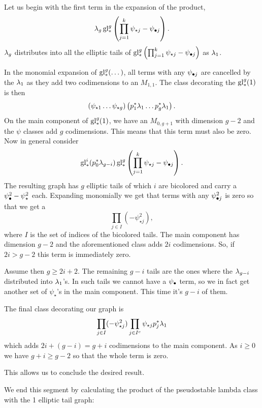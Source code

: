\documentclass[12pt]{memoir}
\begin{document}
\begin{ptcb}
    Let us begin with the first term in the expansion of the product,
    \[
        \lambda_g\operatorname{gl}_{\ast}^g\left(\prod_{j=1}^{k}\psi_{\star j}-\psi_{\bullet j}\right).
    \]
    \(\lambda_g\) distributes into all the elliptic tails of \(\operatorname{gl}_{\ast}^g\left(\prod_{j=1}^{k}\psi_{\star j}-\psi_{\bullet j}\right)\) as \(\lambda_1\).\par
    In the monomial expansion of \(\operatorname{gl}_{\ast}^g(\dots)\), all terms with any \(\psi_{\bullet j}\) are cancelled by the \(\lambda_1\) as they add two codimensions to an \(M_{1,1}\). The class decorating the \(\operatorname{gl}_\ast^g(1)\) is then
    \[
        \left(\psi_{\star1}\dots\psi_{\star g}\right)\left(p_1^\ast\lambda_1\dots p_g^\ast\lambda_1\right).
    \]
    On the main component of \(\operatorname{gl}_\ast^g(1)\), we have an \(M_{0,g+1}\) with dimension \(g-2\) and the \(\psi\) classes add \(g\) codimensions. This means that this term must also be zero.
    \tcbline
    Now in general consider
    \[
        \operatorname{gl}_\ast^i(p_0^\ast\lambda_{g-i})\operatorname{gl}_{\ast}^g\left(\prod_{j=1}^{k}\psi_{\star j}-\psi_{\bullet j}\right).
    \]
    The resulting graph has \(g\) elliptic tails of which \(i\) are bicolored and carry a \(\psi_{\bullet}^2-\psi_\star^2\) each. Expanding monomially we get that terms with any \(\psi_{\bullet j}^2\) is zero so that we get a
    \[
        \prod_{j\in I}(-\psi_{\star j}^2),
    \]
    where \(I\) is the set of indices of the bicolored tails. The main component has dimension \(g-2\) and the aforementioned class adds \(2i\) codimensions. So, if \(2i>g-2\) this term is immediately zero.\par
    Assume then \(g\geq 2i+2\). The remaining \(g-i\) tails are the ones where the \(\lambda_{g-i}\) distributed into \(\lambda_1\)'s. In such tails we cannot have a \(\psi_{\bullet}\) term, so we in fact get another set of \(\psi_{\star}\)'s in the main component. This time it's \(g-i\) of them.\par
    The final class decorating our graph is
    \[
        \prod_{j\in I}(-\psi_{\star j}^2)\prod_{j\in I^c}\psi_{\star j}p_j^{\ast}\lambda_1
    \]
    which adds \(2i+(g-i)=g+i\) codimensions to the main component. As \(i\geq 0\) we have \(g+i\geq g-2\) so that the whole term is zero.\par
    This allows us to conclude the desired result.
\end{ptcb}
We end this segment by calculating the product of the pseudostable lambda class with the 1 elliptic tail graph:
\end{document}
